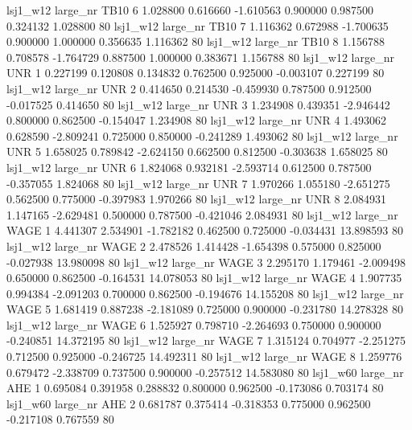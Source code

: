     lsj1_w12   large_nr     TB10                 6  1.028800  0.616660  -1.610563 0.900000 0.987500  0.324132    1.028800 80
    lsj1_w12   large_nr     TB10                 7  1.116362  0.672988  -1.700635 0.900000 1.000000  0.356635    1.116362 80
    lsj1_w12   large_nr     TB10                 8  1.156788  0.708578  -1.764729 0.887500 1.000000  0.383671    1.156788 80
    lsj1_w12   large_nr      UNR                 1  0.227199  0.120808   0.134832 0.762500 0.925000 -0.003107    0.227199 80
    lsj1_w12   large_nr      UNR                 2  0.414650  0.214530  -0.459930 0.787500 0.912500 -0.017525    0.414650 80
    lsj1_w12   large_nr      UNR                 3  1.234908  0.439351  -2.946442 0.800000 0.862500 -0.154047    1.234908 80
    lsj1_w12   large_nr      UNR                 4  1.493062  0.628590  -2.809241 0.725000 0.850000 -0.241289    1.493062 80
    lsj1_w12   large_nr      UNR                 5  1.658025  0.789842  -2.624150 0.662500 0.812500 -0.303638    1.658025 80
    lsj1_w12   large_nr      UNR                 6  1.824068  0.932181  -2.593714 0.612500 0.787500 -0.357055    1.824068 80
    lsj1_w12   large_nr      UNR                 7  1.970266  1.055180  -2.651275 0.562500 0.775000 -0.397983    1.970266 80
    lsj1_w12   large_nr      UNR                 8  2.084931  1.147165  -2.629481 0.500000 0.787500 -0.421046    2.084931 80
    lsj1_w12   large_nr     WAGE                 1  4.441307  2.534901  -1.782182 0.462500 0.725000 -0.034431   13.898593 80
    lsj1_w12   large_nr     WAGE                 2  2.478526  1.414428  -1.654398 0.575000 0.825000 -0.027938   13.980098 80
    lsj1_w12   large_nr     WAGE                 3  2.295170  1.179461  -2.009498 0.650000 0.862500 -0.164531   14.078053 80
    lsj1_w12   large_nr     WAGE                 4  1.907735  0.994384  -2.091203 0.700000 0.862500 -0.194676   14.155208 80
    lsj1_w12   large_nr     WAGE                 5  1.681419  0.887238  -2.181089 0.725000 0.900000 -0.231780   14.278328 80
    lsj1_w12   large_nr     WAGE                 6  1.525927  0.798710  -2.264693 0.750000 0.900000 -0.240851   14.372195 80
    lsj1_w12   large_nr     WAGE                 7  1.315124  0.704977  -2.251275 0.712500 0.925000 -0.246725   14.492311 80
    lsj1_w12   large_nr     WAGE                 8  1.259776  0.679472  -2.338709 0.737500 0.900000 -0.257512   14.583080 80
    lsj1_w60   large_nr      AHE                 1  0.695084  0.391958   0.288832 0.800000 0.962500 -0.173086    0.703174 80
    lsj1_w60   large_nr      AHE                 2  0.681787  0.375414  -0.318353 0.775000 0.962500 -0.217108    0.767559 80
